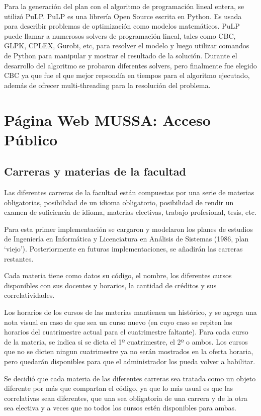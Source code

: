 \documentclass[a4paper]{article}
\begin{document}
Para la generación del plan con el algoritmo de programación lineal entera, se utilizó PuLP\cite{PULP_PYTHON}. PuLP es una librería Open Source escrita en Python. Es usada para describir problemas de optimización como modelos matemáticos. PuLP puede llamar a numerosos solvers de programación lineal, tales como CBC, GLPK, CPLEX, Gurobi, etc, para resolver el modelo y luego utilizar comandos de Python para manipular y mostrar el resultado de la solución. Durante el desarrollo del algoritmo se probaron diferentes solvers, pero finalmente fue elegido CBC ya que fue el que mejor repsondía en tiempos para el algoritmo ejecutado, además de ofrecer multi-threading para la resolución del problema.

\newpage
\section{Página Web MUSSA: Acceso Público}

\subsection{Carreras y materias de la facultad}

Las diferentes carreras de la facultad están compuestas por una serie de materias obligatorias, posibilidad de un idioma obligatorio, posibilidad de rendir un examen de suficiencia de idioma, materias electivas, trabajo profesional, tesis, etc.

Para esta primer implementación se cargaron y modelaron los planes de estudios de Ingeniería en Informática y Licenciatura en Análisis de Sistemas (1986, plan `viejo'). Posteriormente en futuras implementaciones, se añadirán las carreras restantes.\newline

Cada materia tiene como datos su código, el nombre, los diferentes cursos disponibles con sus docentes y horarios, la cantidad de créditos y sus correlatividades.

Los horarios de los cursos de las materias mantienen un histórico, y se agrega una nota visual en caso de que sea un curso nuevo (en cuyo caso se repiten los horarios del cuatrimestre actual para el cuatrimestre faltante). Para cada curso de la materia, se indica si se dicta el 1º cuatrimestre, el 2º o ambos. Los cursos que no se dicten ningun cuatrimestre ya no serán mostrados en la oferta horaria, pero quedarán disponibles para que el administrador los pueda volver a habilitar.

Se decidió que cada materia de las diferentes carreras sea tratada como un objeto diferente por más que compartan el código, ya que lo más usual es que las correlativas sean diferentes, que una sea obligatoria de una carrera y de la otra sea electiva y a veces que no todos los cursos estén disponibles para ambas.
\end{document}
